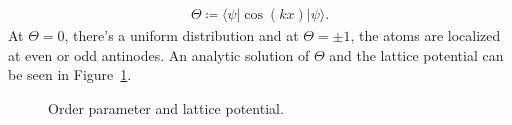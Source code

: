 \begin{align}
\Theta \coloneqq \langle \psi | \cos(kx) | \psi \rangle.
\end{align}At $\Theta = 0$, there's a uniform distribution and at $\Theta = \pm 1$, the atoms are localized at even or odd antinodes. An analytic solution of $\Theta$ and the lattice potential can be seen in Figure~\ref{fig:self-organization}.

\begin{figure}[!htb]
	\begin{minipage}[b]{.5\linewidth}
	\centering
	
	\end{minipage}
%
	\begin{minipage}[b]{.5\linewidth}
	\centering
	
	\end{minipage}
\caption{Order parameter and lattice potential.}
\label{fig:self-organization}
\end{figure}
\FloatBarrier